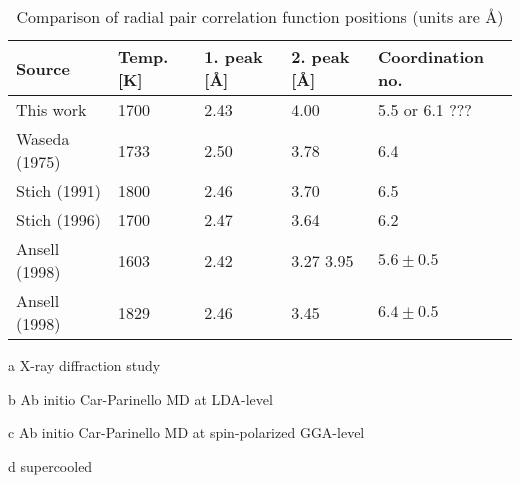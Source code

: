 \documentclass[11pt,bibliography=totoc,index=totoc]{scrbook}   %
\begin{document}
\begin{table}[htbp]
   \centering
   \begin{threeparttable}[htbp]
     \begin{tabular}{lllll}
        \toprule
          Source & Temp. [K] & 1. peak [Å] & 2. peak [Å] & Coordination no. \\
        \midrule
          This work 
            & 1700                  & 2.43 & 4.00       & 5.5 or 6.1 ???  \\
          Waseda (1975)\cite{Waseda:1975}\tnote{a}
            & 1733                  & 2.50 & 3.78       & 6.4   \\
          Stich (1991)\cite{Stich:1991}\tnote{b}    
            & 1800                  & 2.46 & 3.70       & 6.5   \\
          Stich (1996)\cite{Stich:1996}\tnote{c}    
            & 1700                  & 2.47 & 3.64       & 6.2   \\
          Ansell (1998)\cite{Ansell:1998}\tnote{a,d}
            & 1603                  & 2.42 & 3.27 3.95  & $5.6\pm 0.5$   \\
          Ansell (1998)\cite{Ansell:1998}\tnote{a}      
            & 1829                  & 2.46 & 3.45       & $6.4\pm 0.5$   \\
       \bottomrule
     \end{tabular}
     {\footnotesize
       \begin{tablenotes}
         \item[a] X-ray diffraction study
         \item[b] Ab initio Car-Parinello MD at LDA-level
         \item[c] Ab initio Car-Parinello MD at spin-polarized GGA-level
         \item[d] supercooled
       \end{tablenotes}
     }
   \end{threeparttable}
   \caption{Comparison of radial pair correlation function positions (units are Å)}
   \label{tab:pcf}
\end{table}
\end{document}
